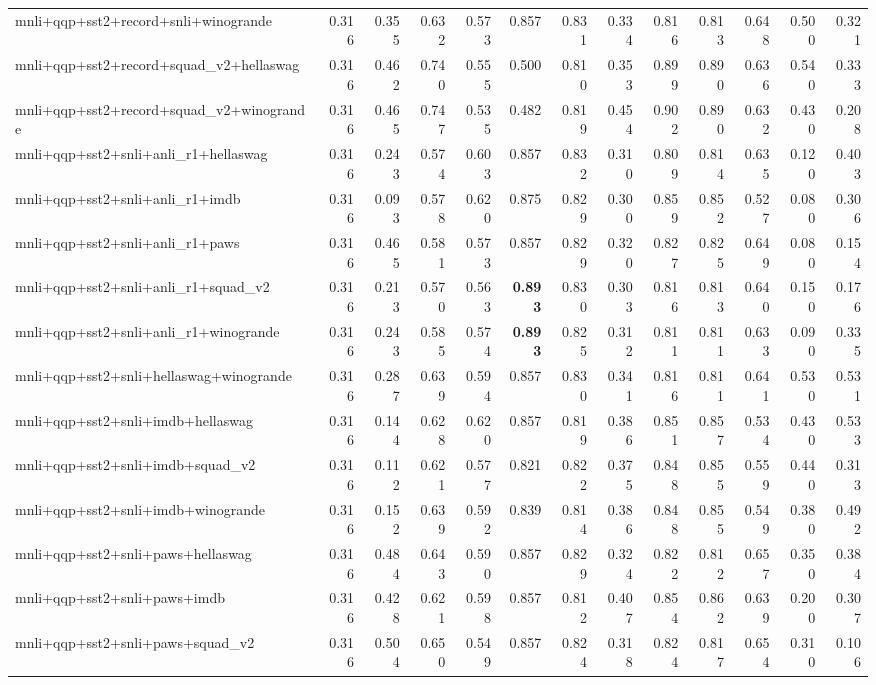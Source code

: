 \begin{table}[t]
\begin{tabular}{lrrrrrrrrrrrr}
    mnli+qqp+sst2+record+snli+winogrande & 0.316 & 0.355 & 0.632 & 0.573 & 0.857 & 0.831 & 0.334 & 0.816 & 0.813 & 0.648 & 0.500 & 0.321 \\
    mnli+qqp+sst2+record+squad\_v2+hellaswag & 0.316 & 0.462 & 0.740 & 0.555 & 0.500 & 0.810 & 0.353 & 0.899 & 0.890 & 0.636 & 0.540 & 0.333 \\
    mnli+qqp+sst2+record+squad\_v2+winogrande & 0.316 & 0.465 & 0.747 & 0.535 & 0.482 & 0.819 & 0.454 & 0.902 & 0.890 & 0.632 & 0.430 & 0.208 \\
    mnli+qqp+sst2+snli+anli\_r1+hellaswag & 0.316 & 0.243 & 0.574 & 0.603 & 0.857 & 0.832 & 0.310 & 0.809 & 0.814 & 0.635 & 0.120 & 0.403 \\
    mnli+qqp+sst2+snli+anli\_r1+imdb & 0.316 & 0.093 & 0.578 & 0.620 & 0.875 & 0.829 & 0.300 & 0.859 & 0.852 & 0.527 & 0.080 & 0.306 \\
    mnli+qqp+sst2+snli+anli\_r1+paws & 0.316 & 0.465 & 0.581 & 0.573 & 0.857 & 0.829 & 0.320 & 0.827 & 0.825 & 0.649 & 0.080 & 0.154 \\
    mnli+qqp+sst2+snli+anli\_r1+squad\_v2 & 0.316 & 0.213 & 0.570 & 0.563 & \textbf{0.893} & 0.830 & 0.303 & 0.816 & 0.813 & 0.640 & 0.150 & 0.176 \\
    mnli+qqp+sst2+snli+anli\_r1+winogrande & 0.316 & 0.243 & 0.585 & 0.574 & \textbf{0.893} & 0.825 & 0.312 & 0.811 & 0.811 & 0.633 & 0.090 & 0.335 \\
    mnli+qqp+sst2+snli+hellaswag+winogrande & 0.316 & 0.287 & 0.639 & 0.594 & 0.857 & 0.830 & 0.341 & 0.816 & 0.811 & 0.641 & 0.530 & 0.531 \\
    mnli+qqp+sst2+snli+imdb+hellaswag & 0.316 & 0.144 & 0.628 & 0.620 & 0.857 & 0.819 & 0.386 & 0.851 & 0.857 & 0.534 & 0.430 & 0.533 \\
    mnli+qqp+sst2+snli+imdb+squad\_v2 & 0.316 & 0.112 & 0.621 & 0.577 & 0.821 & 0.822 & 0.375 & 0.848 & 0.855 & 0.559 & 0.440 & 0.313 \\
    mnli+qqp+sst2+snli+imdb+winogrande & 0.316 & 0.152 & 0.639 & 0.592 & 0.839 & 0.814 & 0.386 & 0.848 & 0.855 & 0.549 & 0.380 & 0.492 \\
    mnli+qqp+sst2+snli+paws+hellaswag & 0.316 & 0.484 & 0.643 & 0.590 & 0.857 & 0.829 & 0.324 & 0.822 & 0.812 & 0.657 & 0.350 & 0.384 \\
    mnli+qqp+sst2+snli+paws+imdb & 0.316 & 0.428 & 0.621 & 0.598 & 0.857 & 0.812 & 0.407 & 0.854 & 0.862 & 0.639 & 0.200 & 0.307 \\
    mnli+qqp+sst2+snli+paws+squad\_v2 & 0.316 & 0.504 & 0.650 & 0.549 & 0.857 & 0.824 & 0.318 & 0.824 & 0.817 & 0.654 & 0.310 & 0.106 \\

\end{tabular}
\end{table}
